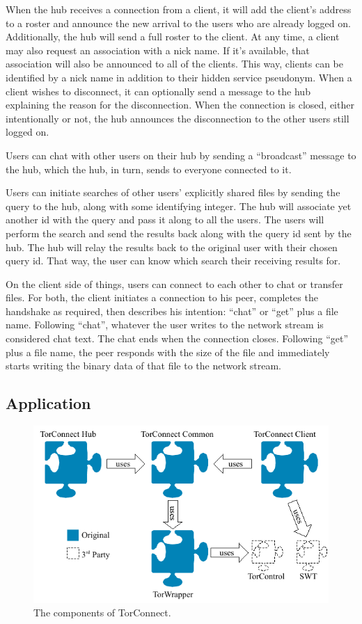 \documentclass{article}
\begin{document}
When the hub receives a connection from a client, it will add the client's address to a roster and announce the new arrival to the users who are already logged on.  Additionally, the hub will send a full roster to the client.  At any time, a client may also request an association with a nick name.  If it's available, that association will also be announced to all of the clients.  This way, clients can be identified by a nick name in addition to their hidden service pseudonym.  When a client wishes to disconnect, it can optionally send a message to the hub explaining the reason for the disconnection.  When the connection is closed, either intentionally or not, the hub announces the disconnection to the other users still logged on.

Users can chat with other users on their hub by sending a ``broadcast'' message to the hub, which the hub, in turn, sends to everyone connected to it.

Users can initiate searches of other users' explicitly shared files by sending the query to the hub, along with some identifying integer.  The hub will associate yet another id with the query and pass it along to all the users.  The users will perform the search and send the results back along with the query id sent by the hub.  The hub will relay the results back to the original user with their chosen query id.   That way, the user can know which search their receiving results for.

On the client side of things, users can connect to each other to chat or transfer files.  For both, the client initiates a connection to his peer, completes the handshake as required, then describes his intention: ``chat'' or ``get'' plus a file name.  Following ``chat'', whatever the user writes to the network stream is considered chat text.  The chat ends when the connection closes.  Following ``get'' plus a file name, the peer responds with the size of the file and immediately starts writing the binary data of that file to the network stream.

\subsection{Application}
\begin{figure}
\centering
\includegraphics{architecture.pdf}
\caption{The components of TorConnect.}
\label{fig:architecture}
\end{figure}
\end{document}
